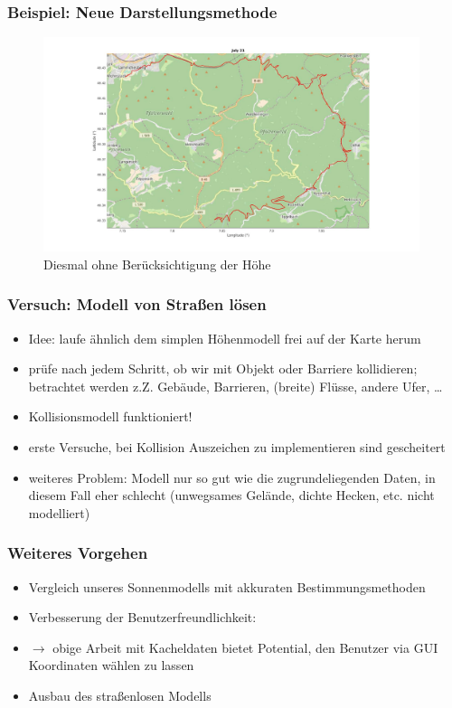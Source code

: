 \documentclass[aspectratio=43]{beamer}
\begin{document}
\begin{frame}
    \frametitle{Beispiel: Neue Darstellungsmethode}
    \begin{figure}[t]
        \centering
        \includegraphics[width=0.98\textwidth]{bilder/noele.jpg}
        \caption{Diesmal ohne Berücksichtigung der Höhe}
    \end{figure}
\end{frame}

\begin{frame}
    \frametitle{Versuch: Modell von Straßen lösen}
    \begin{itemize}
        \item Idee: laufe ähnlich dem simplen Höhenmodell frei auf der Karte herum
        \item prüfe nach jedem Schritt, ob wir mit Objekt oder Barriere kollidieren;
            betrachtet werden z.Z. Gebäude, Barrieren, (breite) Flüsse, andere Ufer, \dots
        \item Kollisionsmodell funktioniert!
        \item erste Versuche, bei Kollision Auszeichen zu implementieren sind gescheitert
        \item weiteres Problem: Modell nur so gut wie die zugrundeliegenden Daten, in
            diesem Fall eher schlecht (unwegsames Gelände, dichte Hecken, etc. nicht
            modelliert)
    \end{itemize}
\end{frame}

\begin{frame}
    \frametitle{Weiteres Vorgehen}
    \begin{itemize}
        \item Vergleich unseres Sonnenmodells mit akkuraten Bestimmungsmethoden
        \item Verbesserung der Benutzerfreundlichkeit:
        \item[] $\rightarrow$ obige Arbeit mit Kacheldaten bietet Potential, den Benutzer
            via GUI Koordinaten wählen zu lassen
        \item Ausbau des straßenlosen Modells
    \end{itemize}
\end{frame}
\end{document}
